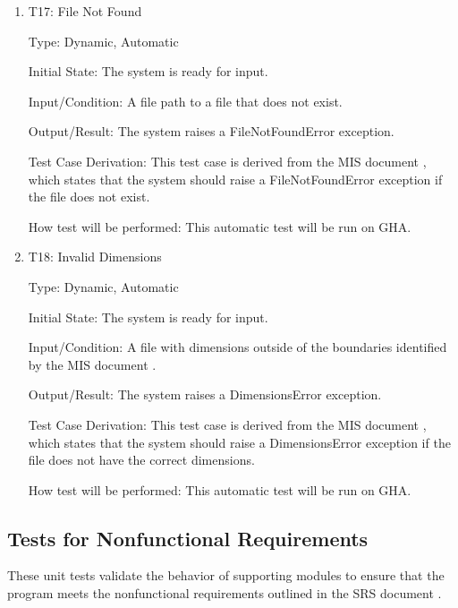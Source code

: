 \documentclass[12pt, titlepage]{article}
\begin{document}
\begin{enumerate}

\item{T17: File Not Found\\}

Type: Dynamic, Automatic

Initial State: The \progname{} system is ready for input.

Input/Condition: A file path to a file that does not exist.

Output/Result: The system raises a FileNotFoundError exception.

Test Case Derivation: This test case is derived from the MIS document \citep{MIS}, which
states that the system should raise a FileNotFoundError exception if the file
does not exist.

How test will be performed: This automatic test will be run on GHA.

\item{T18: Invalid Dimensions\\}

Type: Dynamic, Automatic

Initial State: The \progname{} system is ready for input.

Input/Condition: A file with dimensions outside of the boundaries identified by
the MIS document \citep{MIS}.

Output/Result: The system raises a DimensionsError exception.

Test Case Derivation: This test case is derived from the MIS document
\citep{MIS}, which states that the system should raise a DimensionsError
exception if the file does not have the correct dimensions.

How test will be performed: This automatic test will be run on GHA. 

\end{enumerate}

\subsection{Tests for Nonfunctional Requirements}

These unit tests validate the behavior of supporting modules to ensure that the
\progname{} program meets the nonfunctional requirements outlined in the SRS
document \citep{SRS}.


\end{document}

